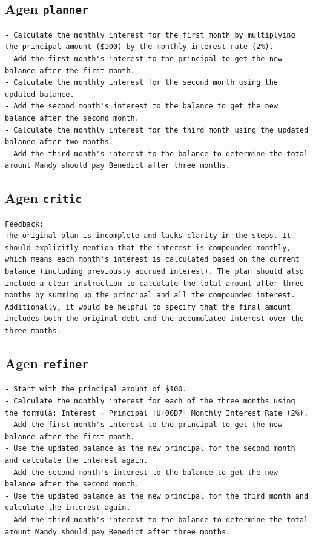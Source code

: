 \subsection*{Agen \texttt{planner}}
\begin{lstlisting}[basicstyle=\ttfamily\scriptsize,breaklines=true,frame=single]
- Calculate the monthly interest for the first month by multiplying the principal amount ($100) by the monthly interest rate (2%).  
- Add the first month's interest to the principal to get the new balance after the first month.  
- Calculate the monthly interest for the second month using the updated balance.  
- Add the second month's interest to the balance to get the new balance after the second month.  
- Calculate the monthly interest for the third month using the updated balance after two months.  
- Add the third month's interest to the balance to determine the total amount Mandy should pay Benedict after three months.
\end{lstlisting}

\subsection*{Agen \texttt{critic}}
\begin{lstlisting}[basicstyle=\ttfamily\scriptsize,breaklines=true,frame=single]
Feedback:  
The original plan is incomplete and lacks clarity in the steps. It should explicitly mention that the interest is compounded monthly, which means each month's interest is calculated based on the current balance (including previously accrued interest). The plan should also include a clear instruction to calculate the total amount after three months by summing up the principal and all the compounded interest. Additionally, it would be helpful to specify that the final amount includes both the original debt and the accumulated interest over the three months.
\end{lstlisting}

\subsection*{Agen \texttt{refiner}}
\begin{lstlisting}[basicstyle=\ttfamily\scriptsize,breaklines=true,frame=single]
- Start with the principal amount of $100.  
- Calculate the monthly interest for each of the three months using the formula: Interest = Principal [U+00D7] Monthly Interest Rate (2%).  
- Add the first month's interest to the principal to get the new balance after the first month.  
- Use the updated balance as the new principal for the second month and calculate the interest again.  
- Add the second month's interest to the balance to get the new balance after the second month.  
- Use the updated balance as the new principal for the third month and calculate the interest again.  
- Add the third month's interest to the balance to determine the total amount Mandy should pay Benedict after three months.
\end{lstlisting}

